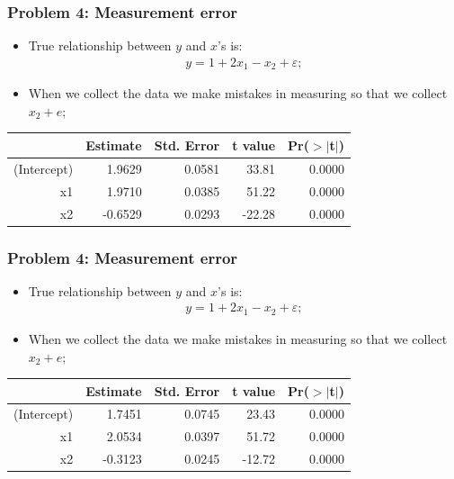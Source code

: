 \documentclass[aspectratio=169]{beamer}
\theoremstyle{principle}
\begin{document}
\begin{frame}
\frametitle{Problem 4: Measurement error}

\begin{itemize}
\item True relationship between $y$ and $x$'s is:
\begin{align*}
y = 1 + 2x_1 - x_2 + \varepsilon;
\end{align*}
\item When we collect the data we make mistakes in measuring so that we collect $x_2 + e$;
\end{itemize}

\begin{table}[ht]
\centering
\begin{tabular}{rrrrr}
  \hline
  \hline
 & Estimate & Std. Error & t value & Pr($>$$|$t$|$) \\ 
  \hline
    \hline
(Intercept) & 1.9629 & 0.0581 & 33.81 & 0.0000 \\ 
  x1 & 1.9710 & 0.0385 & 51.22 & 0.0000 \\ 
  x2 & -0.6529 & 0.0293 & -22.28 & 0.0000 \\ 
   \hline
      \hline
\end{tabular}
\end{table}

\end{frame}

\begin{frame}
\frametitle{Problem 4: Measurement error}

\begin{itemize}
\item True relationship between $y$ and $x$'s is:
\begin{align*}
y = 1 + 2x_1 - x_2 + \varepsilon;
\end{align*}
\item When we collect the data we make mistakes in measuring so that we collect $x_2 + e$;
\end{itemize}

\begin{table}[ht]
\centering
\begin{tabular}{rrrrr}
  \hline
  \hline
 & Estimate & Std. Error & t value & Pr($>$$|$t$|$) \\ 
  \hline
    \hline
(Intercept) & 1.7451 & 0.0745 & 23.43 & 0.0000 \\ 
  x1 & 2.0534 & 0.0397 & 51.72 & 0.0000 \\ 
  x2 & -0.3123 & 0.0245 & -12.72 & 0.0000 \\ 
   \hline
      \hline
\end{tabular}
\end{table}

\end{frame}
\end{document}
